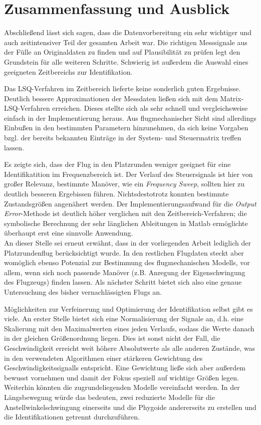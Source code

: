 \chapter{Zusammenfassung und Ausblick}
Abschließend lässt sich sagen, dass die Datenvorbereitung ein sehr wichtiger und auch zeitintensiver Teil der gesamten Arbeit 
war. Die richtigen Messsignale aus der Fülle an Originaldaten zu finden und auf Plausibilität zu prüfen legt den Grundstein 
für alle weiteren Schritte. Schwierig ist außerdem die Auswahl eines geeigneten Zeitbereichs zur Identifikation. 

Das LSQ-Verfahren im Zeitbereich lieferte keine sonderlich guten Ergebnisse. Deutlich bessere Approximationen der Messdaten 
ließen sich mit dem Matrix-LSQ-Verfahren erreichen. Dieses stellte sich als sehr schnell und vergleichsweise einfach in der 
Implementierung heraus. Aus flugmechanischer Sicht sind allerdings Einbußen in den bestimmten Parametern hinzunehmen, da sich 
keine Vorgaben bzgl. der bereits bekannten Einträge in der System- und Steuermatrix treffen lassen.

Es zeigte sich, dass der Flug in den Platzrunden weniger geeignet für eine Identifikatition im Frequenzbereich ist. Der 
Verlauf des Steuersignals ist hier von großer Relevanz, bestimmte Manöver, wie ein \textit{Frequency Sweep}, sollten hier zu 
deutlich besseren Ergebissen führen. Nichtsdestotrotz konnten bestimmte Zustandsgrößen angenähert werden. Der 
Implementierungsaufwand für die \textit{Output Error}-Methode ist deutlich höher verglichen mit den Zeitbereich-Verfahren; 
die symbolische Berechnung der sehr länglichen Ableitungen in Matlab ermöglichte überhaupt erst eine sinnvolle Anwendung.\\

An dieser Stelle sei erneut erwähnt, dass in der vorliegenden Arbeit lediglich der Platzrundenflug berücksichtigt wurde. In 
den restlichen Flugdaten steckt aber womöglich ebenso Potenzial zur Bestimmung des flugmechanischen Modells, vor allem, wenn 
sich noch passende Manöver (z.B. Anregung der Eigenschwingung des Flugzeugs) finden lassen. Als nächster Schritt bietet sich 
also eine genaue Untersuchung des bisher vernachlässigten Flugs an.

Möglichkeiten zur Verfeinerung und Optimierung der Identifikation selbst gibt es viele. An erster Stelle bietet sich eine 
Normalisierung der Signale an, d.h. eine Skalierung mit den Maximalwerten eines jeden Verlaufs, sodass die Werte danach in 
der gleichen Größenordnung liegen. Dies ist sonst nicht der Fall, die Geschwindigkeit erreicht weit höhere Absolutwerte als 
alle anderen Zustände, was in den verwendeten Algorithmen einer stärkeren Gewichtung des Geschwindigkeitssignalls entspricht. 
Eine Gewichtung 
ließe sich aber außerdem bewusst vornehmen und damit der Fokus speziell auf wichtige Größen legen. Weiterhin könnten die 
zugrundeliegenden Modelle vereinfacht werden. In der Längsbewegung würde das bedeuten, zwei reduzierte Modelle für die 
Anstellwinkelschwingung einerseits und die Phygoide andererseits zu erstellen und die Identifikationen getrennt durchzuführen.

